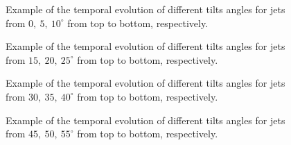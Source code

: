\documentclass[12pt]{ociamthesis}
\begin{document}
\begin{figure}
\captionsetup[subfigure]{labelformat=empty}
\centering
{}
\caption{Example of the temporal evolution of different tilts angles for jets from $0,~5,~10^{\circ}$ from top to bottom, respectively.}
\label{tj_morph_1}
\end{figure}
\begin{figure}
\captionsetup[subfigure]{labelformat=empty}
\centering
{}
\caption{Example of the temporal evolution of different tilts angles for jets from $15,~20,~25^{\circ}$ from top to bottom, respectively.}
\label{tj_morph_2}
\end{figure}
\begin{figure}
\captionsetup[subfigure]{labelformat=empty}
\centering
{}
\caption{Example of the temporal evolution of different tilts angles for jets from $30,~35,~40^{\circ}$ from top to bottom, respectively.}
\label{tj_morph_3}
\end{figure}
\begin{figure}
\captionsetup[subfigure]{labelformat=empty}
\centering
{}
\caption{Example of the temporal evolution of different tilts angles for jets from $45,~50,~55^{\circ}$ from top to bottom, respectively.}
\label{tj_morph_4}
\end{figure}
\end{document}
